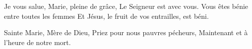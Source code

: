 Je vous salue, Marie, pleine de grâce,
Le Seigneur est avec vous.
Vous êtes bénie entre toutes les femmes
Et Jésus, le fruit de vos entrailles, est béni.

Sainte Marie, Mère de Dieu,
Priez pour nous pauvres pécheurs,
Maintenant et à l’heure de notre mort.